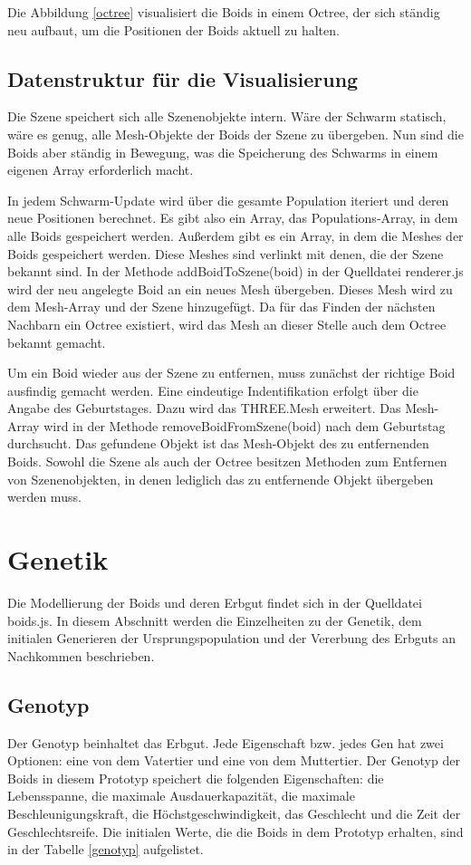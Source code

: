 \documentclass[draft=false
              ,paper=a4
              ,twoside=false
              ,fontsize=11pt
              ,headsepline
              ,BCOR10mm
              ,DIV11
              ,bibtotoc
              ,liststotoc
              ]{scrbook}
\begin{document}
Die Abbildung \ref{octree} visualisiert die Boids in einem Octree, der sich ständig neu aufbaut, um die Positionen der Boids aktuell zu halten.

\subsection{Datenstruktur für die Visualisierung}\label{visualstruktur}
Die Szene speichert sich alle Szenenobjekte intern. Wäre der Schwarm statisch, wäre es genug, alle Mesh-Objekte der Boids der Szene zu übergeben. Nun sind die Boids aber ständig in Bewegung, was die Speicherung des Schwarms in einem eigenen Array erforderlich macht.

In jedem Schwarm-Update wird über die gesamte Population iteriert und deren neue Positionen berechnet. Es gibt also ein Array, das Populations-Array, in dem alle Boids gespeichert werden. Außerdem gibt es ein Array, in dem die Meshes der Boids gespeichert werden. Diese Meshes sind verlinkt mit denen, die der Szene bekannt sind. In der Methode addBoidToSzene(boid) in der Quelldatei renderer.js wird der neu angelegte Boid an ein neues Mesh übergeben. Dieses Mesh wird zu dem Mesh-Array und der Szene hinzugefügt. Da für das Finden der nächsten Nachbarn ein Octree existiert, wird das Mesh an dieser Stelle auch dem Octree bekannt gemacht.

Um ein Boid wieder aus der Szene zu entfernen, muss zunächst der richtige Boid ausfindig gemacht werden. Eine eindeutige Indentifikation erfolgt über die Angabe des Geburtstages. Dazu wird das THREE.Mesh erweitert. Das Mesh-Array wird in der Methode removeBoidFromSzene(boid) nach dem Geburtstag durchsucht. Das gefundene Objekt ist das Mesh-Objekt des zu entfernenden Boids. Sowohl die Szene als auch der Octree besitzen Methoden zum Entfernen von Szenenobjekten, in denen lediglich das zu entfernende Objekt übergeben werden muss.

\section{Genetik}
Die Modellierung der Boids und deren Erbgut findet sich in der Quelldatei boids.js. In diesem Abschnitt werden die Einzelheiten zu der Genetik, dem initialen Generieren der Ursprungspopulation und der Vererbung des Erbguts an Nachkommen beschrieben.

\subsection{Genotyp}
Der Genotyp beinhaltet das Erbgut. Jede Eigenschaft bzw. jedes Gen hat zwei Optionen: eine von dem Vatertier und eine von dem Muttertier. Der Genotyp der Boids in diesem Prototyp speichert die folgenden Eigenschaften: die Lebensspanne, die maximale Ausdauerkapazität, die maximale Beschleunigungskraft, die Höchstgeschwindigkeit, das Geschlecht und die Zeit der Geschlechtsreife. Die initialen Werte, die die Boids in dem Prototyp erhalten, sind in der Tabelle \ref{genotyp} aufgelistet.
\end{document}
